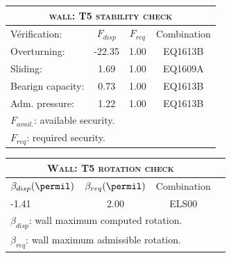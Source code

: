 \begin{center}
\begin{tabular}[H]{|l|c|c|c|}
\hline
\multicolumn{4}{|c|}{\textsc{wall: T5 stability check}}\\
\hline
Vérification:  & $F_{disp}$ & $F_{req}$ & Combination\\
\hline
Overturning:  & -22.35 & 1.00 & EQ1613B\\
Sliding:  & 1.69 & 1.00 & EQ1609A\\
Bearign capacity:  & 0.73 & 1.00 & EQ1613B\\
Adm. pressure:  & 1.22 & 1.00 & EQ1613B\\
\hline
\multicolumn{4}{|l|}{$F_{avail.}$: available security.}\\
\multicolumn{4}{|l|}{$F_{req}$: required security.}\\
\hline
\end{tabular}
\end{center}
\begin{center}
\begin{tabular}[H]{|l|c|c|c|}
\hline
\multicolumn{3}{|c|}{\textsc{Wall: T5 rotation check}}\\
\hline
$\beta_{disp} (\permil)$ & $\beta_{req}(\permil)$ & Combination\\
\hline
-1.41 & 2.00 & ELS00\\
\hline
\multicolumn{3}{|l|}{$\beta_{disp}$: wall maximum computed rotation.}\\
\multicolumn{3}{|l|}{$\beta_{req}$: wall maximum admissible rotation.}\\
\hline
\end{tabular}
\end{center}
 \label{tb_T5}
\tablelasttail{\hline}
